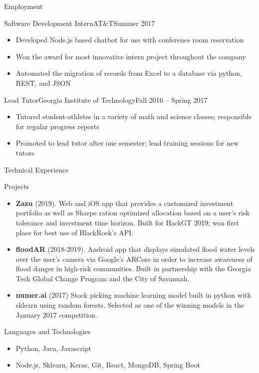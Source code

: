 \documentclass[]{mcdowellcv}
\begin{document}
\begin{cvsection}{Employment}
		\begin{cvsubsection}{Software Development Intern}{AT\&T}{Summer 2017}	
			\begin{itemize}
				\item Developed Node.js based chatbot for use with conference room reservation
				\item Won the award for most innovative intern project throughout the company
				\item Automated the migration of records from Excel to a database via python, REST, and JSON
			\end{itemize}
		\end{cvsubsection}
		
		\begin{cvsubsection}{Lead Tutor}{Georgia Institute of Technology}{Fall 2016 -- Spring 2017}		
			\begin{itemize}
				\item Tutored student-athletes in a variety of math and science classes; responsible for regular progress reports
				\item Promoted to lead tutor after one semester; lead training sessions for new tutors
			\end{itemize}
		\end{cvsubsection}
	\end{cvsection}
	
	\begin{cvsection}{Technical Experience}
		\begin{cvsubsection}{Projects}{}{}
			\begin{itemize}
				\item \textbf{Zazu} (2019). Web and iOS app that provides a customized investment portfolio as well as Sharpe ration optimized allocation based on a user's risk tolerance and investment time horizon. Built for HackGT 2019; won first place for best use of BlackRock's API.
				\item \textbf{floodAR} (2018-2019). Android app that displays simulated flood water levels over the user's camera via Google's ARCore in order to increase awareness of flood danger in high-risk communities. Built in partnership with the Georgia Tech Global Change Program and the City of Savannah.
				\item \textbf{numer.ai} (2017) Stock picking machine learning model built in python with sklearn using random forests. Selected as one of the winning models in the January 2017 competition.
			\end{itemize}
		\end{cvsubsection}
	\end{cvsection}
	
	\begin{cvsection}{Languages and Technologies}
		\begin{cvsubsection}{}{}{}	
			\begin{itemize}
				\item Python, Java, Javascript
				\item Node.js, Sklearn, Keras, Git, React, MongoDB, Spring Boot
			\end{itemize}
		\end{cvsubsection}
	\end{cvsection}
	
\end{document}
